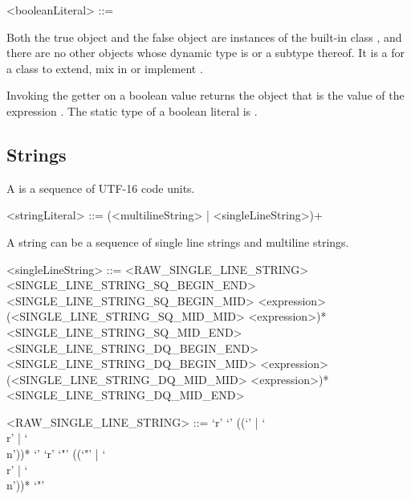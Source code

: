 \documentclass[makeidx]{article}
\begin{document}
{\begin{grammar}
<booleanLiteral> ::= \TRUE{}
  \alt \FALSE{}
\end{grammar}

\LMHash{}%
Both the true object and the false object are instances of
the built-in class ,
and there are no other objects whose dynamic type is 
or a subtype thereof.
It is a  for a class to
extend, mix in or implement .


\LMHash{}%
Invoking the getter  on a boolean value returns
the  object that is the value of the expression .
The static type of a boolean literal is .


\subsection{Strings}

\LMHash{}%
A  is a sequence of UTF-16 code units.


\begin{grammar}
<stringLiteral> ::= (<multilineString> | <singleLineString>)+
\end{grammar}

\LMHash{}%
A string can be a sequence of single line strings and multiline strings.

\begin{grammar}
<singleLineString> ::= <RAW\_SINGLE\_LINE\_STRING>
  \alt <SINGLE\_LINE\_STRING\_SQ\_BEGIN\_END>
  \alt <SINGLE\_LINE\_STRING\_SQ\_BEGIN\_MID> <expression> \gnewline{}
       (<SINGLE\_LINE\_STRING\_SQ\_MID\_MID> <expression>)* \gnewline{}
       <SINGLE\_LINE\_STRING\_SQ\_MID\_END>
  \alt <SINGLE\_LINE\_STRING\_DQ\_BEGIN\_END>
  \alt <SINGLE\_LINE\_STRING\_DQ\_BEGIN\_MID> <expression> \gnewline{}
       (<SINGLE\_LINE\_STRING\_DQ\_MID\_MID> <expression>)* \gnewline{}
       <SINGLE\_LINE\_STRING\_DQ\_MID\_END>

<RAW\_SINGLE\_LINE\_STRING> ::=
  `r' `\sq' (\gtilde(`\sq' | `\\r' | `\\n'))* `\sq'
  \alt `r' `"' (\gtilde(`"' | `\\r' | `\\n'))* `"'


\end{grammar}}
\end{document}
